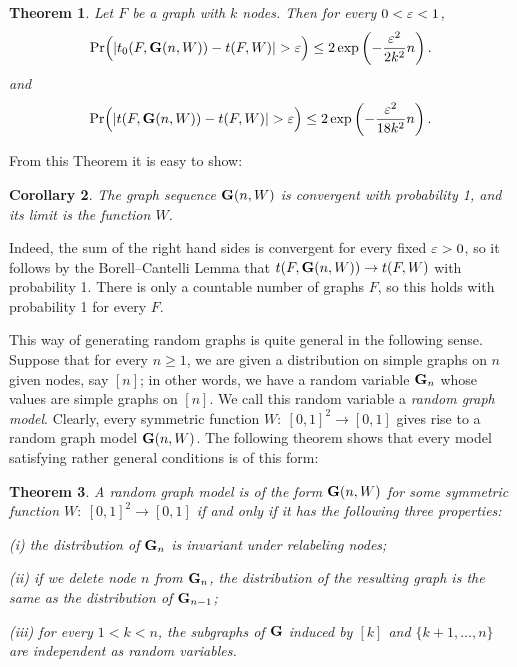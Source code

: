 \documentclass[fleqn]{article}
\newtheorem{theorem}{Theorem}[section]
\newtheorem{corollary}[theorem]{Corollary}
\begin{document}
\begin{theorem}\label{CONC}
Let $F$ be a graph with $k$ nodes. Then for every $0<\varepsilon<1$,
\begin{equation}\label{INJFH}
\Pr\Bigl(|t_0(F,{\mathbf G}(n,W))- t(F,W)| > \varepsilon\Bigr) \le
2\exp\left(-\frac{\varepsilon^2}{2k^2}n\right).
\end{equation}
and
\begin{equation}\label{TFH}
\Pr\Bigl(|t(F,{\mathbf G}(n,W))-t(F,W)| > \varepsilon \Bigr) \le
2\exp\left(-\frac{\varepsilon^2}{18k^2}n\right).
\end{equation}
\end{theorem}

From this Theorem it is easy to show:

\begin{corollary}\label{W-CONVERGE}
The graph sequence ${\mathbf G}(n,W)$ is convergent with probability 1, and
its limit is the function $W$.
\end{corollary}

Indeed, the sum of the right hand sides is convergent for every fixed
$\varepsilon>0$, so it follows by the Borell--Cantelli Lemma that
$t(F,{\mathbf G}(n,W))\to t(F,W)$ with probability 1. There is only a
countable number of graphs $F$, so this holds with probability 1 for
every $F$.

This way of generating random graphs is quite general in the
following sense. Suppose that for every $n\ge 1$, we are given a
distribution on simple graphs on $n$ given nodes, say $[n]$; in other
words, we have a random variable ${\mathbf G}_n$ whose values are simple
graphs on $[n]$. We call this random variable a {\it random graph
model}. Clearly, every symmetric function $W:~[0,1]^2\to[0,1]$ gives
rise to a random graph model ${\mathbf G}(n,W)$. The following theorem shows
that every model satisfying rather general conditions is of this
form:

\begin{theorem}\label{GEN-RAND}
A random graph model is of the form ${\mathbf G}(n,W)$ for some symmetric
function $W:~[0,1]^2\to[0,1]$ if and only if it has the following
three properties:

\smallskip

{\rm (i)} the distribution of ${\mathbf G}_n$ is invariant under relabeling
nodes;

\smallskip

{\rm (ii)} if we delete node $n$ from ${\mathbf G}_n$, the distribution of
the resulting graph is the same as the distribution of ${\mathbf G}_{n-1}$;

\smallskip

{\rm (iii)} for every $1<k<n$, the subgraphs of ${\mathbf G}$ induced by
$[k]$ and $\{k+1,\dots,n\}$ are independent as random variables.
\end{theorem}
\end{document}
